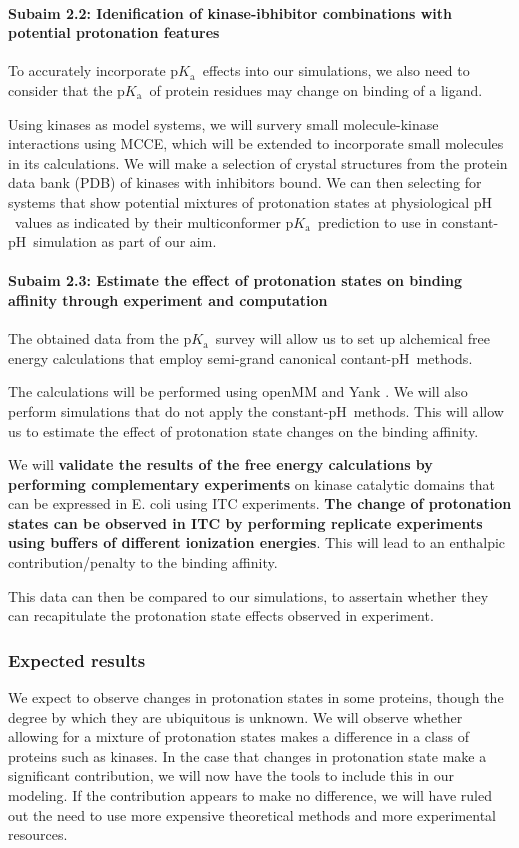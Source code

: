 \documentclass[10pt,final]{article}
\newcommand{\subsubsubsection}[1]{\paragraph*{#1}}
\newcommand{\pKa}{$\mathrm{p}K_\mathrm{a}$\ }
\newcommand{\pH}{$\mathrm{pH}$\ }
\begin{document}
\subsubsubsection{Subaim 2.2: Idenification of kinase-ibhibitor combinations with potential protonation features}
To accurately incorporate \pKa effects into our simulations, we also need to consider that the \pKa of protein residues may change on binding of a ligand. 

Using kinases as model systems, we will survery small molecule-kinase interactions using MCCE\cite{Song2009a}, which will be extended to incorporate small molecules in its calculations.
We will make a selection of crystal structures from the protein data bank (PDB)\cite{Berman2000a} of kinases with inhibitors bound. 
We can then selecting for systems that show potential mixtures of protonation states at physiological \pH values as indicated by their multiconformer \pKa prediction to use in constant-\pH simulation as part of our aim. 


\subsubsubsection{Subaim 2.3: Estimate the effect of protonation states on binding affinity through experiment and computation}
The obtained data from the \pKa survey will allow us to set up alchemical free energy calculations that employ semi-grand canonical contant-\pH methods.\cite{Mongan2004a}

The calculations will be performed using openMM\cite{Eastman2013a} and Yank \cite{Chodera2015a}. We will also perform simulations that do not apply the constant-\pH methods. This will allow us to estimate the effect of protonation state changes on the binding affinity.

We will \textbf{validate the results of the free energy calculations by performing complementary experiments} on kinase catalytic domains that can be expressed in E. coli using ITC experiments. \textbf{The change of protonation states can be observed in ITC by performing replicate experiments using buffers of different ionization energies}. This will lead to an enthalpic contribution/penalty to the binding affinity.

This data can then be compared to our simulations, to assertain whether they can recapitulate the protonation state effects observed in experiment.

\todo[inline,color=violet!40]{short explanation constant-\pH simulations}

\subsubsection*{Expected results}
We expect to observe changes in protonation states in some proteins, though the degree by which they are ubiquitous is unknown. We will observe whether allowing for a mixture of protonation states makes a difference in a class of proteins such as kinases. In the case that changes in protonation state make a significant contribution, we will now have the tools to include this in our modeling. If the contribution appears to make no difference, we will have ruled out the need to use more expensive theoretical methods and more experimental resources.
\end{document}
